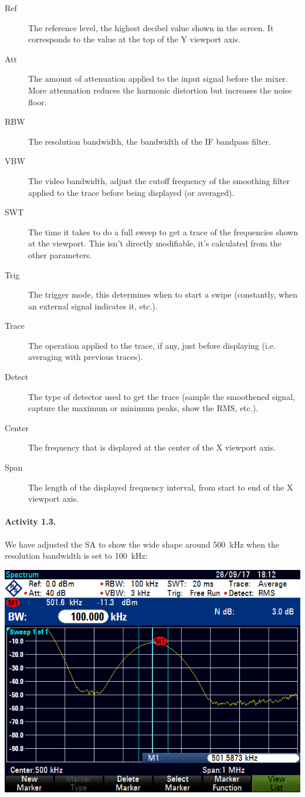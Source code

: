 \begin{description}
\item [Ref] The reference level, the highest decibel value shown in the screen.
It corresponds to the value at the top of the Y viewport axis.
\item [Att] The amount of attenuation applied to the input signal before the
mixer. More attenuation reduces the harmonic distortion but increases the noise
floor.
\item [RBW] The resolution bandwidth, the bandwidth of the IF bandpass filter.
\item [VBW] The video bandwidth, adjust the cutoff frequency of the smoothing
filter applied to the trace before being displayed (or averaged).
\item [SWT] The time it takes to do a full sweep to get a trace of the
frequencies shown at the viewport. This isn't directly modifiable, it's
calculated from the other parameters.
\item [Trig] The trigger mode, this determines when to start a swipe
(constantly, when an external signal indicates it, etc.).
\item [Trace] The operation applied to the trace, if any, just before
displaying (i.e. averaging with previous traces).
\item [Detect] The type of detector used to get the trace (sample the smoothened
signal, capture the maximum or minimum peaks, show the RMS, etc.).
\item [Center] The frequency that is displayed at the center of the X viewport
axis.
\item [Span] The length of the displayed frequency interval, from start to end
of the X viewport axis.
\end{description}

\finishpage


\startpage
\paragraph{Activity 1.3.}

We have adjusted the SA to show the wide shape around \SI{500}{\kilo\hertz}
when the resolution bandwidth is set to \SI{100}{\kilo\hertz}:

\includegraphics[width=\textwidth]{assets/1-3}

